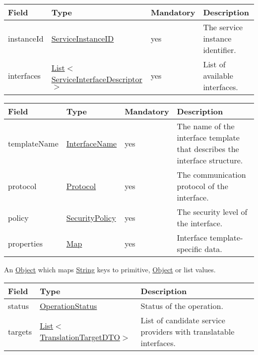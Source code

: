\documentclass[a4paper]{arrowhead}
\newcommand{\pref}[1]{{\textcolor{ArrowheadGrey}{\hyperref[sec:model:primitives:#1]{#1}}}}
\begin{document}
 
\begin{table}[ht!]
\begin{tabularx}{\textwidth}{| p{3cm} | p{5.5cm} | p{2cm} | X |} \hline
\rowcolor{gray!33} Field & Type & Mandatory & Description \\ \hline
instanceId & \pref{ServiceInstanceID} & yes & The service instance identifier. \\ \hline
interfaces & \pref{List}$<$\hyperref[sec:model:ServiceInterfaceDescriptor]{ServiceInterfaceDescriptor}$>$ & yes & List of available interfaces. \\ \hline
\end{tabularx}
\end{table}

 
\begin{table}[ht!]
\begin{tabularx}{\textwidth}{| p{2.5cm} | p{3cm} | p{2cm} | X |} \hline
\rowcolor{gray!33} Field & Type & Mandatory & Description \\ \hline
templateName & \pref{InterfaceName} & yes & The name of the interface template that describes the interface structure. \\ \hline
protocol & \pref{Protocol} & yes & The communication protocol of the interface.  \\ \hline
policy & \pref{SecurityPolicy} & yes & The security level of the interface. \\ \hline
properties &\hyperref[sec:model:Map]{Map} & yes & Interface template-specific data. \\ \hline
\end{tabularx}
\end{table}

\clearpage


An \pref{Object} which maps \pref{String} keys to primitive, \pref{Object} or list values.

 
\begin{table}[ht!]
\begin{tabularx}{\textwidth}{| p{1.5cm} | p{4.5cm} | X |} \hline
\rowcolor{gray!33} Field & Type      & Description \\ \hline
status & \pref{OperationStatus} & Status of the operation. \\ \hline
targets & \pref{List}$<$\hyperref[sec:model:TranslationTargetDTO]{TranslationTargetDTO}$>$ & List of candidate service providers with translatable interfaces. \\ \hline
\end{tabularx}
\end{table}
\end{document}
